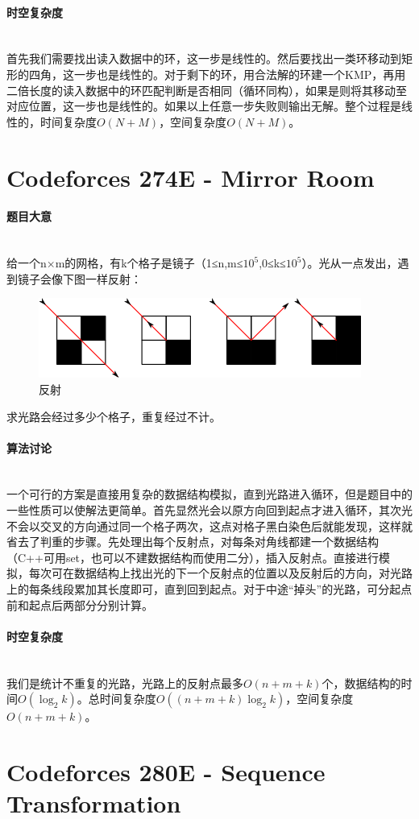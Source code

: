 \documentclass[UTF8]{ctexart}
\newcommand{\myparagraph}[1]{\paragraph{#1}\mbox{}\\}
\theoremstyle{nonumberplain}
\begin{document}
		\myparagraph{时空复杂度}
		
			首先我们需要找出读入数据中的环，这一步是线性的。然后要找出一类环移动到矩形的四角，这一步也是线性的。对于剩下的环，用合法解的环建一个KMP，再用二倍长度的读入数据中的环匹配判断是否相同（循环同构），如果是则将其移动至对应位置，这一步也是线性的。如果以上任意一步失败则输出无解。整个过程是线性的，时间复杂度$O(N+M)$，空间复杂度$O(N+M)$。
	
	\section{Codeforces 274E - Mirror Room}
		
		\myparagraph{题目大意}
			
			给一个n×m的网格，有k个格子是镜子（1≤n,m≤$10^5$,0≤k≤$10^5$）。光从一点发出，遇到镜子会像下图一样反射：
			
			\begin{figure}[ht]
				\centering
				\includegraphics[width=\textwidth]{fig274e_1.png}
				\caption{反射}
			\end{figure}
			
			求光路会经过多少个格子，重复经过不计。
			
		\myparagraph{算法讨论}
		
			一个可行的方案是直接用复杂的数据结构模拟，直到光路进入循环，但是题目中的一些性质可以使解法更简单。首先显然光会以原方向回到起点才进入循环，其次光不会以交叉的方向通过同一个格子两次，这点对格子黑白染色后就能发现，这样就省去了判重的步骤。先处理出每个反射点，对每条对角线都建一个数据结构（C++可用set，也可以不建数据结构而使用二分），插入反射点。直接进行模拟，每次可在数据结构上找出光的下一个反射点的位置以及反射后的方向，对光路上的每条线段累加其长度即可，直到回到起点。对于中途“掉头”的光路，可分起点前和起点后两部分分别计算。
		
		\myparagraph{时空复杂度}
		
			我们是统计不重复的光路，光路上的反射点最多$O(n+m+k)$个，数据结构的时间$O(\log_2k)$。总时间复杂度$O((n+m+k)\log_2k)$，空间复杂度$O(n+m+k)$。
	
	\section{Codeforces 280E - Sequence Transformation}
	
\end{document}
